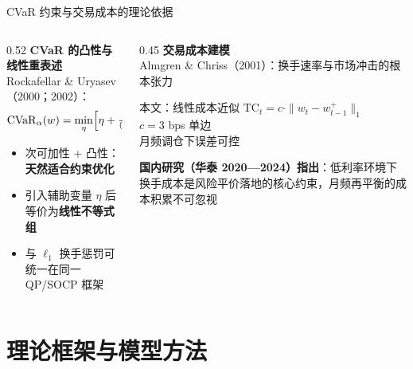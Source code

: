 \documentclass[aspectratio=169,11pt]{beamer}
\newcommand{\txCostBps}{3}
\begin{document}
\begin{frame}{CVaR 约束与交易成本的理论依据}
  \begin{columns}[T]
    \begin{column}{0.52\textwidth}
      \textbf{CVaR 的凸性与线性重表述}\\[0.3em]
      Rockafellar \& Uryasev（2000；2002）：
      \[
        \mathrm{CVaR}_\alpha(w) = \min_\eta \Bigl[\eta + \tfrac{1}{(1-\alpha)T}
        \textstyle\sum_t\max(-r_t^\top w - \eta,\, 0)\Bigr]
      \]
      \begin{itemize}
        \item 次可加性 + 凸性：\textbf{天然适合约束优化}
        \item 引入辅助变量 $\eta$ 后等价为\textbf{线性不等式组}
        \item 与 $\ell_1$ 换手惩罚可统一在同一 QP/SOCP 框架
      \end{itemize}
    \end{column}
    \begin{column}{0.45\textwidth}
      \textbf{交易成本建模}\\[0.3em]
      Almgren \& Chriss（2001）：换手速率与市场冲击的根本张力
      \vspace{0.4em}
      \begin{block}{本文：线性成本近似}
        \centering
        $\mathrm{TC}_t = c \cdot \|w_t - w_{t-1}^+\|_1$\\[0.3em]
        \small $c = \txCostBps$ bps 单边\\月频调仓下误差可控
      \end{block}
      \vspace{0.4em}
      \small \textbf{国内研究（华泰 2020—2024）指出}：低利率环境下换手成本是风险平价落地的核心约束，月频再平衡的成本积累不可忽视
    \end{column}
  \end{columns}
\end{frame}

\section{理论框架与模型方法}
\end{document}
